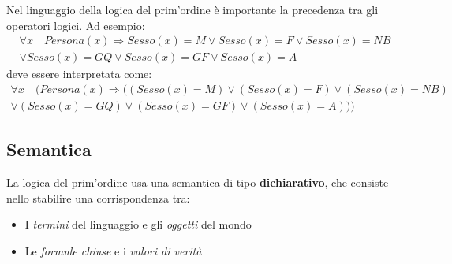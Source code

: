 \begin{observation}[Precedenza]
	Nel linguaggio della logica del prim'ordine è importante la precedenza tra gli operatori logici. Ad esempio:
	\begin{align*}
		\forall x \quad Persona(x) \Rightarrow Sesso(x)=M \lor Sesso(x)=F \lor Sesso(x)=NB \\
		\lor  Sesso(x)=GQ \lor Sesso(x)=GF \lor Sesso(x)=A
	\end{align*}
	deve essere interpretata come:
	\begin{align*}
		\forall x \quad (Persona(x) \Rightarrow ((Sesso(x)=M) \lor (Sesso(x)=F) \lor (Sesso(x)=NB) \\
		\lor (Sesso(x)=GQ) \lor (Sesso(x)=GF) \lor (Sesso(x)=A)))
	\end{align*}
\end{observation}

\subsection{Semantica}
La logica del prim'ordine usa una semantica di tipo \textbf{dichiarativo}, che consiste nello stabilire una corrispondenza tra:
\begin{itemize}
	\item I \textit{termini} del linguaggio e gli \textit{oggetti} del mondo
	\item Le \textit{formule chiuse} e i \textit{valori di verità}
\end{itemize}

